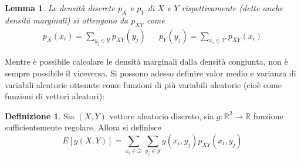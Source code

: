 \documentclass{article}
\theoremstyle{plain}
\newtheorem{lemma}{Lemma}[section]
\theoremstyle{definition}
\newtheorem{definizione}{Definizione}[section]
\theoremstyle{remark}
\begin{document}
\begin{lemma}
	Le densità discrete $p_X$ e $p_Y$ di $X$ e $Y$ rispettivamente (dette anche densità marginali) si ottengono da $p_{XY}$ come
	\begin{align*}
		p_X(x_i)=\sum_{y_j\in\mathcal{Y}}p_{XY}(y_j)&& p_Y(y_j)=\sum_{x_i\in\mathcal{X}}p_{XY}(x_i)
	\end{align*}
\end{lemma}
Mentre è possibile calcolare le densità marginali dalla densità congiunta, non è sempre possibile il viceversa. Si possono adesso definire valor medio e varianza di variabili aleatorie ottenute come funzioni di più variabili aleatorie (cioè come funzioni di vettori aleatori):
\begin{definizione}
	Sia $(X,Y)$ vettore aleatorio discreto, sia $g:\mathds{R}^2\to\mathds{R}$ funzione sufficientemente regolare. Allora si definisce
	\begin{equation*}
		E[g(X,Y)]=\sum_{x_i\in\mathcal{X}}\sum_{y_j\in\mathcal{Y}}g(x_i,y_j)p_{XY}(x_i,y_j)
	\end{equation*}
\end{definizione}
\end{document}

